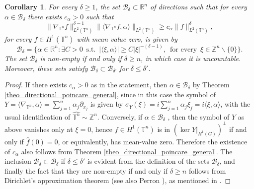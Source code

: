 \documentclass[11pt]{amsart}
\numberwithin{theorem}{section}
\numberwithin{equation}{section}
\newtheorem{corollary}[theorem]{Corollary}
\theoremstyle{definition}
\numberwithin{example}{section}
\theoremstyle{definition}
\theoremstyle{definition}
\newcommand{\R}{\mathbb{R}}
\newcommand{\Z}{\mathbb{Z}}
\newcommand{\T}{\mathbb{T}}
\begin{document}
\begin{corollary}\label{coro_irrational}
      For every $\delta\geq 1$, the set $\mathcal{B}_\delta\subset \R^n$ of directions such that for every $\alpha\in \mathcal{B}_\delta$ there exists $c_\alpha>0$ such that \begin{equation*}
        \|\nabla_{\T^n} f\|_{L^2(\T^n)}^{\delta-1}\| \langle \nabla_{\T^n} f,\alpha\rangle \|_{L^2(\T^n)}\geq c_\alpha\|f\|_{L^2(\T^n)}^\delta,
    \end{equation*}
    for every $f\in H^1(\T^n)$ with mean value zero, is given by 
\begin{equation*}
    \mathcal{B}_\delta=\Big\{\alpha\in\R^n : \exists C>0\ \operatorname{s. t.}\ |\langle \xi,\alpha\rangle |\geq C|\xi|^{-(\delta-1)},\ \operatorname{ for\ every }\ \xi\in\Z^n\backslash\{0\}\Big\}.
\end{equation*}
The set $\mathcal{B}_\delta$ is non-empty if and only if $\delta\geq n$, in which case it is uncountable. Moreover, these sets satisfy $\mathcal{B}_\delta\subset \mathcal{B}_{\delta'}$ for $\delta\leq \delta'$.
\end{corollary}
\begin{proof}
    If there exists $c_\alpha>0$ as in the statement, then $\alpha\in \mathcal{B}_\delta$ by Theorem \ref{theo_directional_poincare_general}, since in this case the symbol of  $Y=\langle \nabla_{\T^n},\alpha\rangle=\sum_{j=1}^n \alpha_j\partial_{x_j}$ is given by $\sigma_Y(\xi)=i\sum_{j=1}^n \alpha_j\xi_j=i\langle \xi,\alpha\rangle$, with the usual identification of $\widehat{\T^n}\sim\Z^n$. Conversely, if $\alpha\in\mathcal{B}_\delta$ , then the symbol of $Y$ as above vanishes only at $\xi=0$, hence $f\in H^1(\T^n)$ is in $(\ker Y|_{H^1(G)})^\perp$ if and only if $\widehat{f}(0)=0$, or equivalently, has mean-value zero. Therefore the existence of $c_\alpha$ also follows from Theorem \ref{theo_directional_poincare_general}. The inclusion $\mathcal{B}_{\delta}\subset \mathcal{B}_{\delta}$ if $\delta\leq \delta'$ is evident from the definition of the sets $\mathcal{B}_\delta$, and finally the fact that they are non-empty if and only if $\delta\geq n$ follows from Dirichlet's approximation theorem (see also Perron \cite{Perron}), as mentioned in \cite{directional_Poincare}.
\end{proof}
\end{document}
